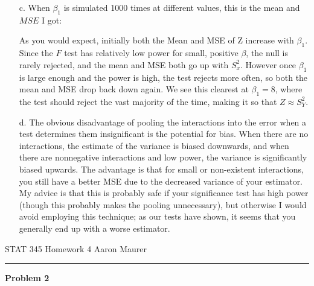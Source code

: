 \documentclass[11pt]{article}
\theoremstyle{definition}
\begin{document}
\begin{itemize}
    \item[c.] When $\beta_1$ is simulated 1000 times at different values, this is the mean and $MSE$ I got: 
        \FloatBarrier
         
        \FloatBarrier
        As you would expect, initially both the Mean and MSE of Z increase with $\beta_1$. Since the $F$ test has relatively low power for small, positive $\beta$, the null is rarely rejected, and the mean and MSE both go up with $S_x^2$. However once $\beta_1$ is large enough and the power is high, the test rejects more often, so both the mean and MSE drop back down again. We see this clearest at $\beta_1=8$, where the test should reject the vast majority of the time, making it so that $Z\approx S_Y^2$.
    \item[d.]
        The obvious disadvantage of pooling the interactions into the error when a test determines them insignificant is the potential for bias. When there are no interactions, the estimate of the variance is biased downwards, and when there are nonnegative interactions and low power, the variance is significantly biased upwards. The advantage is that for small or non-existent interactions, you still have a better MSE due to the decreased variance of your estimator. My advice is that this is probably safe if your significance test has high power (though this probably makes the pooling unnecessary), but otherwise I would avoid employing this technique; as our tests have shown, it seems that you generally end up with a worse estimator.
\end{itemize}
\newpage
\null
\newpage
STAT 345 Homework 4 \hfill Aaron Maurer
\vspace{2mm}
\hrule
\vspace{2mm}
{\bf Problem 2}
\end{document}

